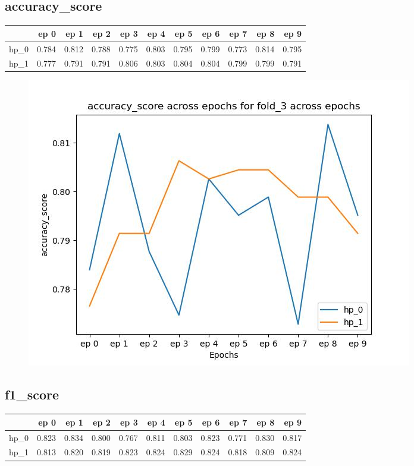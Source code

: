 \documentclass{article}
\begin{document}
\subsection{accuracy\_score}
\begin{tabular}{lrrrrrrrrrr}
\toprule
{} &   ep 0 &   ep 1 &   ep 2 &   ep 3 &   ep 4 &   ep 5 &   ep 6 &   ep 7 &   ep 8 &   ep 9 \\
\midrule
hp\_0 &  0.784 &  0.812 &  0.788 &  0.775 &  0.803 &  0.795 &  0.799 &  0.773 &  0.814 &  0.795 \\
hp\_1 &  0.777 &  0.791 &  0.791 &  0.806 &  0.803 &  0.804 &  0.804 &  0.799 &  0.799 &  0.791 \\
\bottomrule
\end{tabular}

\begin{figure}[H]
\includegraphics[scale = 0.75]{fold_3/accuracy_score}
\end{figure}
\subsection{f1\_score}
\begin{tabular}{lrrrrrrrrrr}
\toprule
{} &   ep 0 &   ep 1 &   ep 2 &   ep 3 &   ep 4 &   ep 5 &   ep 6 &   ep 7 &   ep 8 &   ep 9 \\
\midrule
hp\_0 &  0.823 &  0.834 &  0.800 &  0.767 &  0.811 &  0.803 &  0.823 &  0.771 &  0.830 &  0.817 \\
hp\_1 &  0.813 &  0.820 &  0.819 &  0.823 &  0.824 &  0.829 &  0.824 &  0.818 &  0.809 &  0.824 \\
\bottomrule
\end{tabular}
\end{document}
